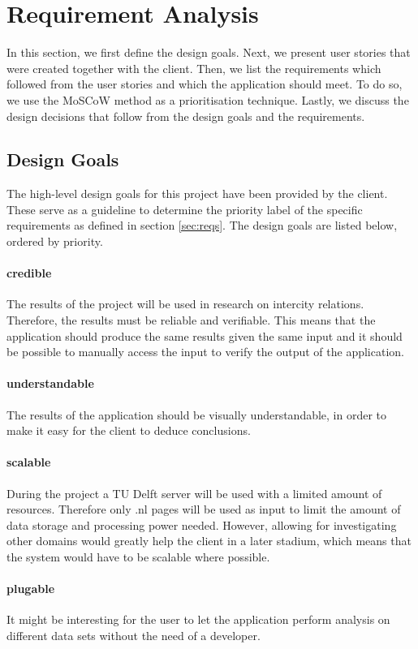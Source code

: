 \section {Requirement Analysis}\label{sec:reqs-analysis}
In this section, we first define the design goals. Next, we present user stories that were created together with the client. Then, we list the requirements which followed from the user stories and which the application should meet. To do so, we use the MoSCoW method\cite{clegg1994case} as a prioritisation technique. Lastly, we discuss the design decisions that follow from the design goals and the requirements.

\subsection{Design Goals} \label{sec:design-goals}
The high-level design goals for this project have been provided by the client. These serve as a guideline to determine the priority label of the specific requirements as defined in section \ref{sec:reqs}. The design goals are listed below, ordered by priority.

\paragraph{credible} The results of the project will be used in research on intercity relations. Therefore, the results must be reliable and verifiable. This means that the application should produce the same results given the same input and it should be possible to manually access the input to verify the output of the application.
\paragraph{understandable} The results of the application should be visually understandable, in order to make it easy for the client to deduce conclusions. 
\paragraph{scalable} During the project a TU Delft server will be used with a limited amount of resources. Therefore only .nl pages will be used as input to limit the amount of data storage and processing power needed. However, allowing for investigating other domains would greatly help the client in a later stadium, which means that the system would have to be scalable where possible.
\paragraph{plugable} It might be interesting for the user to let the application perform analysis on different data sets without the need of a developer. 
